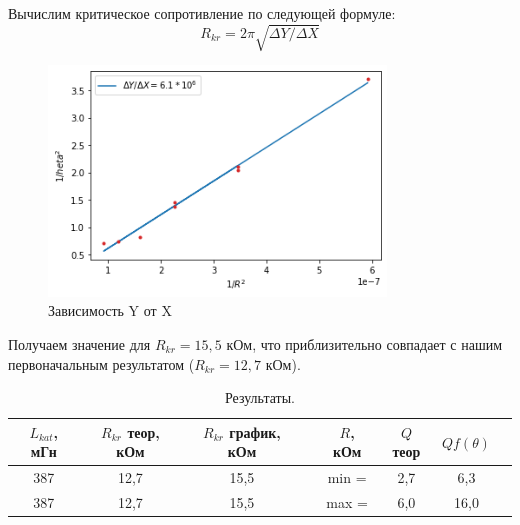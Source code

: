 \documentclass[a4paper, 12pt]{article}%
\begin{document}
\newpage
\begin{center}
Вычислим критическое сопротивление по следующей формуле:
\begin{equation}
R_{kr} = 2 \pi \sqrt{\Delta Y / \Delta X}
\end{equation}

\begin{figure}[h!]
\begin{center}
\includegraphics[width = 0.8\textwidth]{3.png}
\caption{Зависимость Y от X}
\end{center}
\end{figure}
Получаем значение для $R_{kr} = 15,5$ кОм, что приблизительно совпадает с нашим первоначальным результатом ($R_{kr} = 12,7$ кОм).


\begin{table}[h!]
\begin{center}
\begin{tabular}{|c|c|c|c|c|c|c|c|}
\hline
$L_{kat}$, мГн & $R_{kr}$ теор, кОм & $R_{kr}$ график, кОм & & $R$, кОм  & $Q$ теор &  $Q f(\theta)$  \\ \hline
387       & 12,7  & 15,5 & & min =  & 2,7 & 6,3    \\ \hline
387     & 12,7  & 15,5 & & max = & 6,0 & 16,0  \\ \hline

\end{tabular}
\caption{Результаты.}
\end{center}
\end{table}
\end{center}
\end{document}
